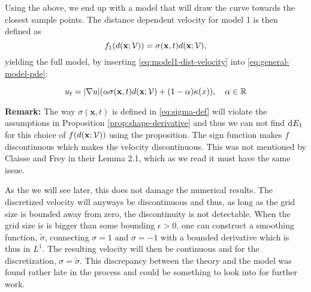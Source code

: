 Using the above, we end up with a model that will draw the curve towards the closest sample points. The distance dependent velocity for model 1 is then defined as
\begin{equation}
    f_1(d(\mathbf{x};\mathcal{V})) = \sigma(\mathbf{x}, t) d(\mathbf{x};\mathcal{V}),
    \label{eq:model1-dist-velocity}
\end{equation}
yielding the full model, by inserting \eqref{eq:model1-dist-velocity} into \eqref{eq:general-model-pde}: \\
\begin{tcolorbox}[title=Model 1]
\begin{equation}
    u_t = |\nabla u|(\alpha\sigma(\mathbf{x}, t) d(\mathbf{x}; \mathcal{V}) + (1-\alpha) \kappa(x)), \quad \alpha \in \mathbb{R}
    \label{eq:model1-pde}
\end{equation} 
\end{tcolorbox}

\textbf{Remark:} The way $\sigma(\mathbf{x}, t)$ is defined in \eqref{eq:sigma-def} will violate the assumptions in Proposition \ref{prop:shape-derivative} and thus we can not find $\mathop{}\!\mathrm{d} E_1$ for this choice of $f(d(\mathbf{x};\mathcal{V}))$ using the proposition. The sign function makes $f$ discontinuous which makes the velocity discontinuous. This was not mentioned by Claisse and Frey \cite{Claisse-Frey} in their Lemma 2.1, which as we read it must have the same issue. 

As the we will see later, this does not damage the numerical results. The discretized velocity will anyways be discontinuous and thus, as long as the grid size is bounded away from zero, the discontinuity is not detectable. When the grid size is is bigger than some bounding $\epsilon>0$, one can construct a smoothing function, $\tilde{\sigma}$, connecting $\sigma=1$ and $\sigma=-1$ with a bounded derivative which is thus in $L^1$. The resulting velocity will then be continuous and for the discretization, $\sigma=\tilde{\sigma}$. This discrepancy between the theory and the model was found rather late in the process and could be something to look into for further work.


